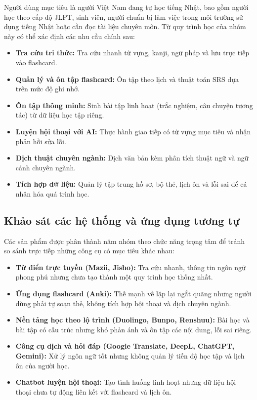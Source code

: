 \documentclass[../DoAn.tex]{subfiles}
\begin{document}
Người dùng mục tiêu là người Việt Nam đang tự học tiếng Nhật, bao gồm người học theo cấp độ JLPT, sinh viên, người chuẩn bị làm việc trong môi trường sử dụng tiếng Nhật hoặc cần đọc tài liệu chuyên môn. Từ quy trình học của nhóm này có thể xác định các nhu cầu chính sau:
\begin{itemize}[itemsep=0pt,parsep=0pt,topsep=2pt,partopsep=0pt]
    \item \textbf{Tra cứu tri thức:} Tra cứu nhanh từ vựng, kanji, ngữ pháp và lưu trực tiếp vào flashcard.
    \item \textbf{Quản lý và ôn tập flashcard:} Ôn tập theo lịch và thuật toán SRS dựa trên mức độ ghi nhớ.
    \item \textbf{Ôn tập thông minh:} Sinh bài tập linh hoạt (trắc nghiệm, câu chuyện tương tác) từ dữ liệu học tập riêng.
    \item \textbf{Luyện hội thoại với AI:} Thực hành giao tiếp có từ vựng mục tiêu và nhận phản hồi sửa lỗi.
    \item \textbf{Dịch thuật chuyên ngành:} Dịch văn bản kèm phân tích thuật ngữ và ngữ cảnh chuyên ngành.
    \item \textbf{Tích hợp dữ liệu:} Quản lý tập trung hồ sơ, bộ thẻ, lịch ôn và lỗi sai để cá nhân hóa quá trình học.
\end{itemize}

\subsection{Khảo sát các hệ thống và ứng dụng tương tự}
\label{subsection:2.1.2}

Các sản phẩm được phân thành năm nhóm theo chức năng trọng tâm để tránh so sánh trực tiếp những công cụ có mục tiêu khác nhau:
\begin{itemize}[itemsep=0pt,parsep=0pt,topsep=2pt,partopsep=0pt]
    \item \textbf{Từ điển trực tuyến (Mazii, Jisho):} Tra cứu nhanh, thông tin ngôn ngữ phong phú nhưng chưa tạo thành một quy trình học thống nhất.
    \item \textbf{Ứng dụng flashcard (Anki):} Thế mạnh về lặp lại ngắt quãng nhưng người dùng phải tự soạn thẻ, không tích hợp hội thoại và dịch chuyên ngành.
    \item \textbf{Nền tảng học theo lộ trình (Duolingo, Bunpo, Renshuu):} Bài học và bài tập có cấu trúc nhưng khó phản ánh và ôn tập các nội dung, lỗi sai riêng.
    \item \textbf{Công cụ dịch và hỏi đáp (Google Translate, DeepL, ChatGPT, Gemini):} Xử lý ngôn ngữ tốt nhưng không quản lý tiến độ học tập và lịch ôn của người học.
    \item \textbf{Chatbot luyện hội thoại:} Tạo tình huống linh hoạt nhưng dữ liệu hội thoại chưa tự động liên kết với flashcard và lịch ôn.
\end{itemize}
\end{document}
